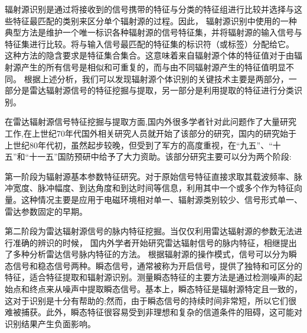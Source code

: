 辐射源识别是通过将接收到的信号携带的特征与分类的特征组进行比较并选择与这些特征最匹配的类别来区分单个辐射源的过程。因此，
辐射源识别中使用的一种典型方法是维护一个唯一标识各种辐射源的信号特征集，并将辐射源的输入信号与特征集进行比较。将与输入信号最匹配的特征集的标识符（或标签）分配给它\cite{Talbot2003Specific,Zanetti2012Exploring}。
这种方法的隐含要求是特征集合集合。这意味着来自辐射源个体的特征值对于由辐射源产生的所有信号是相似和可重复的，而与由不同辐射源产生的特征值明显不同\cite{Talbot2003Specific}。
根据上述分析，我们可以发现辐射源个体识别的关键技术主要是两部分，一部分是雷达辐射源信号的特征挖掘与提取，另一部分是利用提取的特征进行分类识别。

在雷达辐射源信号特征挖掘与提取方面,国内外很多学者针对此问题作了大量研究工作,在上世纪70年代国外相关研究人员就开始了该部分的研究\cite{therrien1974application}，国内的研究始于上世纪80年代初，虽然起步较晚，但受到了军方的高度重视，在“九五”、“十五”和“十一五”国防预研中给予了大力资助。该部分研究主要可以分为两个阶段:

第一阶段为辐射源基本参数特征研究。对于原始信号特征直接求取其载波频率、脉冲宽度、脉冲幅度、到达角度和到达时间等信息\cite{徐欣2001雷达截获系统实时信号分选处理技术研究}，利用其中一个或多个作为特征向量。这种情况主要是应用于电磁环境相对单一、辐射源类别较少、信号形式单一、雷达参数固定的早期。

第二阶段为雷达辐射源信号的脉内特征挖掘。当仅仅利用雷达辐射源的参数无法进行准确的辨识的时候，
国内外学者开始研究雷达辐射信号的脉内特征，相继提出了多种分析雷达信号脉内特征的方法。
根据辐射源的操作模式，信号可以分为瞬态信号和稳态信号两种。瞬态信号，通常被称为开启信号，提供了独特和可区分的特征，适合特征提取和辐射源识别\cite{choe1995novel,ureten2005bayesian}。测量瞬态特征的主要方法是通过检测噪声的起始点和终点来从噪声中提取瞬态信号\cite{huang2000bayesian}。基本上，瞬态特征是辐射源特定且一致的，这对于识别是十分有帮助的;然而，由于瞬态信号的持续时间非常短，所以它们很难被捕获。此外，瞬态特征很容易受到非理想和复杂的信道条件的阻碍，这可能对识别结果产生负面影响\cite{xu2007identification}。

